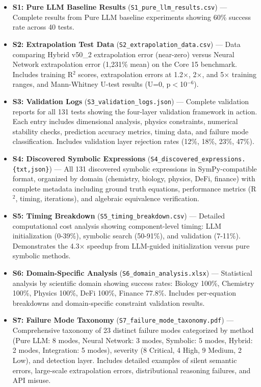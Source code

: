 \documentclass[twoside,11pt]{article}
\begin{document}
\begin{itemize}
\item \textbf{S1: Pure LLM Baseline Results} (\texttt{S1\_pure\_llm\_results.csv}) --- Complete results from Pure LLM baseline experiments showing 60\% success rate across 40 tests.

\item \textbf{S2: Extrapolation Test Data} (\texttt{S2\_extra\-polation\_data.csv}) --- Data comparing Hybrid v50\_2 extrapolation error (near-zero) versus Neural Network extrapolation error (1{,}231\% mean) on the Core 15 benchmark. Includes training R$^2$ scores, extrapolation errors at 1.2$\times$, 2$\times$, and 5$\times$ training ranges, and Mann-Whitney U-test results (U=0, p$<$10$^{-6}$).

\item \textbf{S3: Validation Logs} (\texttt{S3\_validation\_logs.json}) --- Complete validation reports for all 131 tests showing the four-layer validation framework in action. Each entry includes dimensional analysis, physics constraints, numerical stability checks, prediction accuracy metrics, timing data, and failure mode classification. Includes validation layer rejection rates (12\%, 18\%, 23\%, 47\%).

\item \textbf{S4: Discovered Symbolic Expressions} (\texttt{S4\_discovered\_expressions.\{txt,json\}}) --- All 131 discovered symbolic expressions in SymPy-compatible format, organized by domain (chemistry, biology, physics, DeFi, finance) with complete metadata including ground truth equations, performance metrics (R$^2$, timing, iterations), and algebraic equivalence verification.

\item \textbf{S5: Timing Breakdown} (\texttt{S5\_timing\_breakdown.csv}) --- Detailed computational cost analysis showing component-level timing: LLM initialization (0-39\%), symbolic search (50-91\%), and validation (7-11\%). Demonstrates the 4.3× speedup from LLM-guided initialization versus pure symbolic methods.

\item \textbf{S6: Domain-Specific Analysis} (\texttt{S6\_domain\_analysis.xlsx}) --- Statistical analysis by scientific domain showing success rates: Biology 100\%, Chemistry 100\%, Physics 100\%, DeFi 100\%, Finance 77.8\%. Includes per-equation breakdowns and domain-specific constraint validation results.

\item \textbf{S7: Failure Mode Taxonomy} (\texttt{S7\_failure\_mode\_taxonomy.pdf}) --- Comprehensive taxonomy of 23 distinct failure modes categorized by method (Pure LLM: 8 modes, Neural Network: 3 modes, Symbolic: 5 modes, Hybrid: 2 modes, Integration: 5 modes), severity (8 Critical, 4 High, 9 Medium, 2 Low), and detection layer. Includes detailed examples of silent semantic errors, large-scale extrapolation errors, distributional reasoning failures, and API misuse.


\end{itemize}
\end{document}
